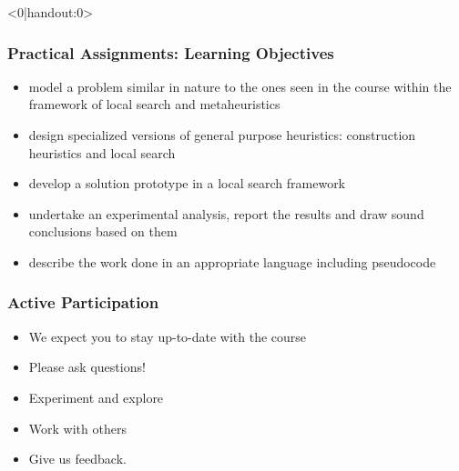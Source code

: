 \documentclass[handout,usepdftitle=false,aspectratio=169,smaller,compress,sans,fleqn,xcolor=dvipsnames,fleqn,table]{beamer}
\begin{document}
\begin{frame}<0|handout:0>%
  \frametitle{Practical Assignments: Learning Objectives}


\medskip
\begin{itemize}
  \itemsep=2ex
\item \alert{model} a problem similar in nature to the ones seen in the course
  within the framework of local search and metaheuristics
\item \alert{design} specialized versions of general purpose heuristics:
  construction heuristics and local search
\item \alert{develop} a solution prototype in a local search framework
\item \alert{undertake an experimental analysis}, report the results and draw
  sound conclusions based on them
\item \alert{describe} the work done in an appropriate language including pseudocode
\end{itemize}


  \end{frame}






\begin{frame}%
  \frametitle{Active Participation}

  \medskip\begin{itemize}\itemsep=3ex
  \item We expect you to stay up-to-date with the course\\
    \item Please ask questions!
    \item Experiment and explore
    \item Work with others
    \item Give us feedback.
    \end{itemize}
  \end{frame}
\end{document}
